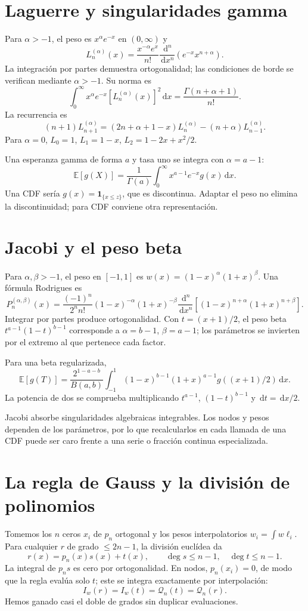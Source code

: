 \documentclass[11pt,a4paper]{article}
\newcommand{\E}{\mathbb E}
\newcommand{\ind}{\mathbf 1}
\newcommand{\dd}{\,\mathrm d}
\theoremstyle{definition}
\begin{document}
\section{Laguerre y singularidades gamma}
Para $\alpha>-1$, el peso es $x^\alpha e^{-x}$ en $(0,\infty)$ y
\[
L_n^{(\alpha)}(x)=\frac{x^{-\alpha}e^x}{n!}
\frac{\dd^n}{\dd x^n}\left(e^{-x}x^{n+\alpha}\right).
\]
La integración por partes demuestra ortogonalidad; las condiciones de borde se verifican mediante $\alpha>-1$. Su norma es
\[
\int_0^\infty x^\alpha e^{-x}[L_n^{(\alpha)}(x)]^2\dd x
=\frac{\Gamma(n+\alpha+1)}{n!}.
\]
La recurrencia es
\[
(n+1)L_{n+1}^{(\alpha)}
=(2n+\alpha+1-x)L_n^{(\alpha)}-(n+\alpha)L_{n-1}^{(\alpha)}.
\]
Para $\alpha=0$, $L_0=1$, $L_1=1-x$, $L_2=1-2x+x^2/2$.

Una esperanza gamma de forma $a$ y tasa uno se integra con $\alpha=a-1$:
\[
\E[g(X)]=\frac1{\Gamma(a)}\int_0^\infty x^{a-1}e^{-x}g(x)\dd x.
\]
Una CDF sería $g(x)=\ind_{\{x\le z\}}$, que es discontinua. Adaptar el peso no elimina la discontinuidad; para CDF conviene otra representación.

\section{Jacobi y el peso beta}
Para $\alpha,\beta>-1$, el peso en $[-1,1]$ es
$w(x)=(1-x)^\alpha(1+x)^\beta$. Una fórmula Rodrigues es
\[
P_n^{(\alpha,\beta)}(x)=
\frac{(-1)^n}{2^nn!}(1-x)^{-\alpha}(1+x)^{-\beta}
\frac{\dd^n}{\dd x^n}
[(1-x)^{n+\alpha}(1+x)^{n+\beta}].
\]
Integrar por partes produce ortogonalidad. Con $t=(x+1)/2$, el peso beta $t^{a-1}(1-t)^{b-1}$ corresponde a $\alpha=b-1$, $\beta=a-1$; los parámetros se invierten por el extremo al que pertenece cada factor.

Para una beta regularizada,
\[
\E[g(T)]=\frac{2^{1-a-b}}{B(a,b)}
\int_{-1}^1(1-x)^{b-1}(1+x)^{a-1}g((x+1)/2)\dd x.
\]
La potencia de dos se comprueba multiplicando $t^{a-1}$, $(1-t)^{b-1}$ y $\dd t=\dd x/2$.

Jacobi absorbe singularidades algebraicas integrables. Los nodos y pesos dependen de los parámetros, por lo que recalcularlos en cada llamada de una CDF puede ser caro frente a una serie o fracción continua especializada.

\section{La regla de Gauss y la división de polinomios}
Tomemos los $n$ ceros $x_i$ de $p_n$ ortogonal y los pesos interpolatorios
$w_i=\int w\ell_i$. Para cualquier $r$ de grado $\le2n-1$, la división euclídea da
\[
r(x)=p_n(x)s(x)+t(x),\qquad \deg s\le n-1,\quad\deg t\le n-1.
\]
La integral de $p_ns$ es cero por ortogonalidad. En nodos, $p_n(x_i)=0$, de modo que la regla evalúa solo $t$; este se integra exactamente por interpolación:
\[
I_w(r)=I_w(t)=\mathcal Q_n(t)=\mathcal Q_n(r).
\]
Hemos ganado casi el doble de grados sin duplicar evaluaciones.
\end{document}
